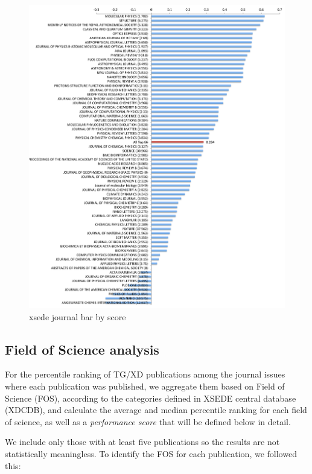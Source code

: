 \documentclass{sig-alternate}
\begin{document}
\begin{figure}[htb] 
  \centering 
    \includegraphics[width=1.0\columnwidth]{images-new/xsede-journal-score.pdf} 
  \caption{xsede journal bar by score}\label{F:xsede-score} 
 \end{figure}

\subsection{Field of Science analysis}


For the percentile ranking of TG/XD publications among the journal
issues where each publication was published, we aggregate them based
on Field of Science (FOS), according to the categories defined in
XSEDE central database (XDCDB), and calculate the average and median
percentile ranking for each field of science, as well as a
\emph{performance score} that will be defined below in detail.

We include only those with at least five publications so the results
are not statistically meaningless. To identify the FOS for each
publication, we followed this:
\end{document}
